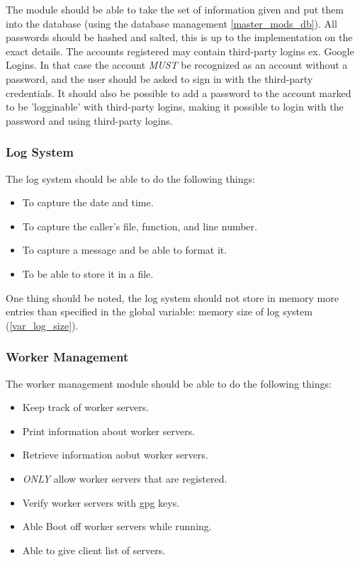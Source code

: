 \documentclass[a4paper]{article}
\begin{document}
The module should be able to take the set of information given and put them
into the database (using the database management \ref{master_mods_db}).
All passwords should be hashed and salted, this is up to the implementation on
the exact details. The accounts registered may contain third-party logins ex. 
Google Logins. In that case the account \emph{MUST} be recognized as an account
without a password, and the user should be asked to sign in with the 
third-party credentials. It should also be possible to add a password to the 
account marked to be 'logginable' with third-party logins, making it possible 
to login with the password and using third-party logins.

\subsubsection{Log System}
\label{master_mods_log}
The log system should be able to do the following things:
\begin{itemize}
	\item To capture the date and time.
	\item To capture the caller's file, function, and line number.
	\item To capture a message and be able to format it.
	\item To be able to store it in a file.
\end{itemize}

One thing should be noted, the log system should not store in memory more 
entries than specified in the global variable: memory size of log system
(\ref{var_log_size}).

\subsubsection{Worker Management}
\label{master_mods_worker}
The worker management module should be able to do the following things:
\begin{itemize}
	\item Keep track of worker servers.
	\item Print information about worker servers.
	\item Retrieve information aobut worker servers.
	\item \emph{ONLY} allow worker servers that are registered.
	\item Verify worker servers with gpg keys.
	\item Able Boot off worker servers while running.
	\item Able to give client list of servers.
\end{itemize}
\end{document}
